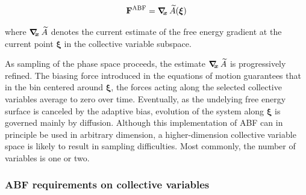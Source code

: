 \begin{equation}
  \label{eq:abf}
  {\bf F}^{\rm ABF} = \mbox{\boldmath$\nabla_{\!\!x}\,$} \widetilde A({\mbox{\boldmath{$\xi$}}})
\end{equation}

where $\mbox{\boldmath$\nabla_{\!\!x}\,$} \widetilde A$ denotes the current estimate of the
free energy gradient at the current point $\bm{\xi}$ in the collective
variable subspace.

As sampling of the phase space proceeds, the estimate
$\mbox{\boldmath$\nabla_{\!\!x}\,$} \widetilde A$ is progressively refined. The biasing
force introduced in the equations of motion guarantees that in
the bin centered around $\bm{\xi}$,
the forces acting along the selected collective variables average
to zero over time. Eventually, as the undelying free energy surface is canceled
by the adaptive bias, evolution of the system along $\bm{\xi}$
is governed mainly by diffusion.
Although this implementation of ABF can in principle be used in 
arbitrary dimension, a higher-dimension collective variable space is likely
to result in sampling difficulties.
Most commonly, the number of variables is one or two.


\subsubsection*{ABF requirements on collective variables}
\label{sec:colvarbias_abf_req}

